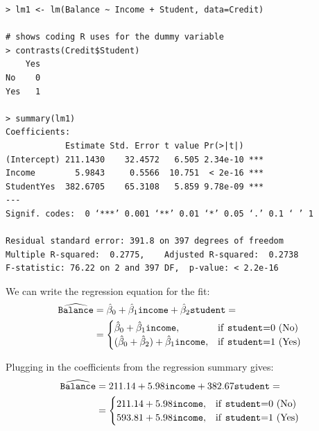 \documentclass[10pt]{beamer}\usepackage[]{graphicx}\usepackage[]{color}
\begin{document}
\begin{frame}[fragile]
\small
\begin{verbatim}
> lm1 <- lm(Balance ~ Income + Student, data=Credit)

# shows coding R uses for the dummy variable
> contrasts(Credit$Student) 
    Yes
No    0
Yes   1

> summary(lm1)
Coefficients:
            Estimate Std. Error t value Pr(>|t|)    
(Intercept) 211.1430    32.4572   6.505 2.34e-10 ***
Income        5.9843     0.5566  10.751  < 2e-16 ***
StudentYes  382.6705    65.3108   5.859 9.78e-09 ***
---
Signif. codes:  0 ‘***’ 0.001 ‘**’ 0.01 ‘*’ 0.05 ‘.’ 0.1 ‘ ’ 1

Residual standard error: 391.8 on 397 degrees of freedom
Multiple R-squared:  0.2775,	Adjusted R-squared:  0.2738 
F-statistic: 76.22 on 2 and 397 DF,  p-value: < 2.2e-16
\end{verbatim}
\end{frame}

\begin{frame}
We can write the regression equation for the fit:
\begin{align*}
\widehat{\texttt{Balance}} &= \hat{\beta}_0 + \hat{\beta}_1 \texttt{income} + \hat{\beta}_2 \texttt{student} =\\ 
&= \begin{cases}
\hat{\beta}_0 + \hat{\beta}_1 \texttt{income}, & \text{if \texttt{student}=0 (No)}\\
(\hat{\beta}_0 + \hat{\beta}_2) + \hat{\beta}_1 \texttt{income}, & \text{if \texttt{student}=1 (Yes)}\\
\end{cases}
\end{align*}
\vspace{10pt}

Plugging in the coefficients from the regression summary gives:
\begin{align*}
\widehat{\texttt{Balance}} &= 211.14 + 5.98 \texttt{income} + 382.67 \texttt{student} =\\ 
&= \begin{cases}
211.14 + 5.98 \texttt{income}, & \text{if \texttt{student}=0 (No)}\\
593.81 + 5.98 \texttt{income}, & \text{if \texttt{student}=1 (Yes)}\\
\end{cases}
\end{align*}
\end{frame}
\end{document}
